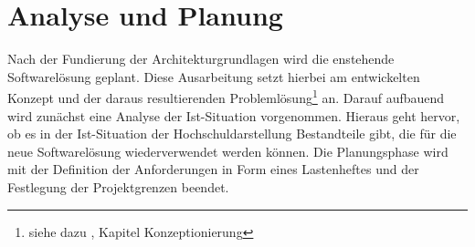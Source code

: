 \section{Analyse und Planung}
\label{sec:AnalyseUndPlanung}

Nach der Fundierung der Architekturgrundlagen wird die enstehende Softwarelösung geplant. Diese Ausarbeitung setzt hierbei
am entwickelten Konzept und der daraus resultierenden Problemlösung\footnote{siehe dazu \citet{unternehmensfuehrung2014}, Kapitel Konzeptionierung} an.
Darauf aufbauend wird zunächst eine Analyse der Ist-Situation vorgenommen. 
Hieraus geht hervor, ob es in der Ist-Situation der Hochschuldarstellung Bestandteile gibt, die für die 
neue Softwarelösung wiederverwendet werden können. Die Planungsphase wird mit der Definition der Anforderungen in 
Form eines Lastenheftes und der Festlegung der Projektgrenzen beendet.